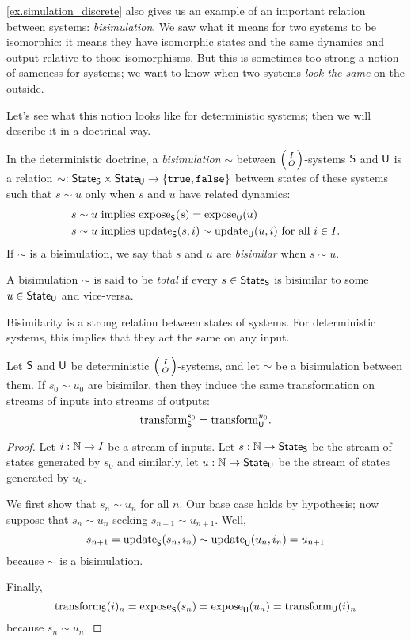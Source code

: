 \documentclass[DynamicalBook]{subfiles}
\begin{document}
\cref{ex.simulation_discrete} also gives us an example of an important relation between
systems: \emph{bisimulation}. We saw what it means for two systems to be
isomorphic: it means they have isomorphic states and the same dynamics and
output relative to those isomorphisms. But this is sometimes too strong a notion
of sameness for systems; we want to know when two systems \emph{look the same}
on the outside. 

Let's see what this notion looks like for deterministic systems; then we will
describe it in a doctrinal way.
\begin{definition}\label{def.bisimulation_discrete}
  In the deterministic doctrine, a \emph{bisimulation} $\sim$ between $\lens{I}{O}$-systems $\mathsf{S}$ and
  $\mathsf{U}$ is a relation $\sim : \mathsf{State}_{\mathsf{S}} \times \mathsf{State}_{\mathsf{U}} \to \{\mathtt{true},
  \mathtt{false}\}$ between states of these systems such that $s \sim u$ only when $s$
  and $u$ have related dynamics:
  \begin{align*}
    s \sim u &\mbox{ implies } \mathrm{expose}_{\mathsf{S}}(s) = \mathrm{expose}_{\mathsf{U}}(u) \\
    s \sim u &\mbox{ implies } \mathrm{update}_{\mathsf{S}}(s, i) \sim \mathrm{update}_{\mathsf{U}}(u, i) \mbox{ for all $i \in I$}.
  \end{align*}
  If $\sim$ is a bisimulation, we say that $s$ and $u$ are \emph{bisimilar} when
  $s \sim u$.
  
  A bisimulation $\sim$ is said to be \emph{total} if every $s \in \mathsf{State}_{\mathsf{S}}$ is
  bisimilar to some $u \in \mathsf{State}_{\mathsf{U}}$ and vice-versa.
\end{definition}

Bisimilarity is a strong relation between states of systems. For deterministic
systems, this implies that they act the same on any input.
\begin{proposition}\label{prop.bisimulation_discrete}
  Let $\mathsf{S}$ and $\mathsf{U}$ be deterministic $\lens{I}{O}$-systems, and let $\sim$ be a
  bisimulation between them. If $s_0 \sim u_0$ are bisimilar, then they
  induce the same transformation on streams of inputs into streams of outputs: 
$$\mathrm{transform}^{s_0}_{\mathsf{S}} = \mathrm{transform}^{u_0}_{\mathsf{U}}.$$
\end{proposition}
\begin{proof}
Let $i : \mathbb{N} \to I$ be a stream of inputs. Let $s : \mathbb{N} \to \mathsf{State}_{\mathsf{S}}$ be the
stream of states generated by $s_0$ and similarly, let $u : \mathbb{N} \to \mathsf{State}_{\mathsf{U}}$
be the stream of states generated by $u_0$. 

We first show that $s_n \sim u_n$ for all $n$. Our base case holds by
hypothesis; now suppose that $s_n \sim u_n$ seeking $s_{n+1} \sim u_{n + 1}$.
Well,
\[s_{n +1} = \mathrm{update}_{\mathsf{S}}(s_n, i_n) \sim \mathrm{update}_{\mathsf{U}}(u_n, i_n) = u_{n+1}\]
because $\sim$ is a bisimulation.

Finally, 
\[
\mathrm{transform}_{\mathsf{S}}(i)_n = \mathrm{expose}_{\mathsf{S}}(s_n) = \mathrm{expose}_{\mathsf{U}}(u_n) = \mathrm{transform}_{\mathsf{U}}(i)_n
\]
because $s_n \sim u_n$. 
\end{proof}
\end{document}
